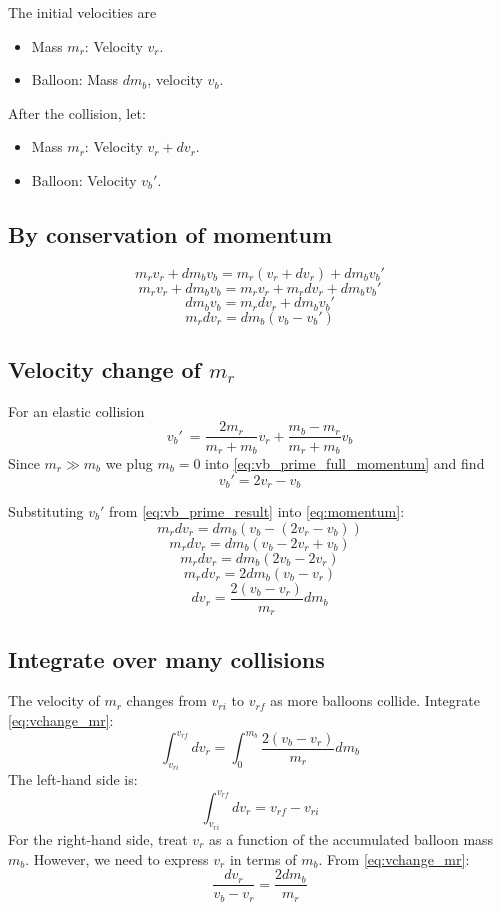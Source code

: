 \documentclass{article}
\begin{document}
{The initial velocities are
\begin{itemize}
\item Mass \( m_r \): Velocity \( v_r \).
\item Balloon: Mass \( dm_b \), velocity \( v_b \).
\end{itemize}
After the collision, let:
\begin{itemize}
    \item Mass \( m_r \): Velocity \( v_r + dv_r \).
    \item Balloon: Velocity \( v_b' \).
\end{itemize}
\subsection{By conservation of momentum} \[
m_r v_r + dm_b v_b = m_r (v_r + dv_r) + dm_b v_b'
\]
\[
m_r v_r + dm_b v_b = m_r v_r + m_r dv_r + dm_b v_b'
\]
\[
dm_b v_b = m_r dv_r + dm_b v_b'
\]
\begin{equation}
m_r dv_r = dm_b (v_b - v_b') \label{eq:momentum}
\end{equation}

\subsection[Velocity change of rocket mass]{Velocity change of \(m_r\)}
For an elastic collision
\begin{equation}
    v_b'\ = \frac{2m_r}{m_r+m_b}v_r + \frac{m_b-m_r}{m_r+m_b}v_b \label{eq:vb_prime_full_momentum}
\end{equation}
Since \(m_r \gg m_b\)   we plug \(m_b = 0\)  into \autoref{eq:vb_prime_full_momentum} and find 
\begin{equation}
v_b' = 2v_r - v_b  \label{eq:vb_prime_result}
\end{equation}      

Substituting \(v_b'\) from  \autoref{eq:vb_prime_result} into \autoref{eq:momentum}:
\[
m_r dv_r = dm_b (v_b - (2 v_r - v_b))
\]
\[
m_r dv_r = dm_b (v_b - 2 v_r + v_b)
\]
\[
m_r dv_r = dm_b (2 v_b - 2 v_r)
\]
\[
m_r dv_r = 2 dm_b (v_b - v_r)
\]
\begin{equation}
dv_r = \frac{2 (v_b - v_r)}{m_r} dm_b \label{eq:vchange_mr}
\end{equation}

\subsection{Integrate over many collisions}
The velocity of \( m_r \) changes from \( v_{ri} \) to \( v_{rf} \) as more balloons collide. Integrate \autoref{eq:vchange_mr}:
\[
\int_{v_{ri}}^{v_{rf}} dv_r = \int_0^{m_b} \frac{2 (v_b - v_r)}{m_r} dm_b
\]
The left-hand side is:
\[
\int_{v_{ri}}^{v_{rf}} dv_r = v_{rf} - v_{ri}
\]
For the right-hand side, treat \( v_r \) as a function of the accumulated balloon mass \( m_b \). However, we need to express \( v_r \) in terms of \( m_b \). From \autoref{eq:vchange_mr}:
\begin{equation}
\frac{dv_r}{v_b - v_r} = \frac{2 dm_b}{m_r}\label{eq:dvr_velocity_relation}
\end{equation}

}
\end{document}
